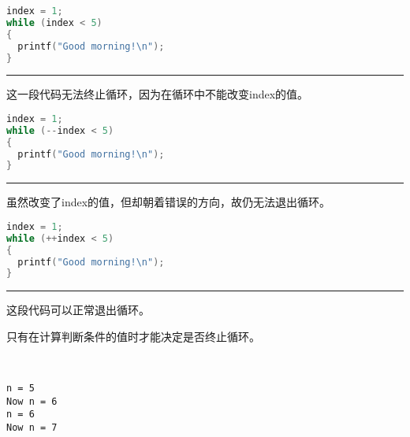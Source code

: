 \begin{frame}[fragile]
\begin{lstlisting}[language=c]
index = 1;
while (index < 5)
{
  printf("Good morning!\n");
}
\end{lstlisting} 
\rule{\textwidth}{1mm}\pause \vspace{0.1in}

这一段代码无法终止循环，因为在循环中不能改变index的值。
\end{frame}

\begin{frame}[fragile]
\begin{lstlisting}[language=c]
index = 1;
while (--index < 5)
{
  printf("Good morning!\n");
}
\end{lstlisting} 
\rule{\textwidth}{1mm}\pause \vspace{0.1in}

虽然改变了index的值，但却朝着错误的方向，故仍无法退出循环。
\end{frame}

\begin{frame}[fragile]
\begin{lstlisting}[language=c]
index = 1;
while (++index < 5)
{
  printf("Good morning!\n");
}
\end{lstlisting} 
\rule{\textwidth}{1mm}\pause \vspace{0.1in}

这段代码可以正常退出循环。
\end{frame}

\begin{frame}[fragile]
只有在计算判断条件的值时才能决定是否终止循环。
\end{frame}

\begin{frame}[fragile]
  \begin{minipage}{0.65\textwidth}
    
  \end{minipage}~~~~
  \begin{minipage}{0.3\textwidth}
\begin{lstlisting}[backgroundcolor=\color{red!10}]
n = 5
Now n = 6
n = 6
Now n = 7
\end{lstlisting}
    
  \end{minipage}


\end{frame}

